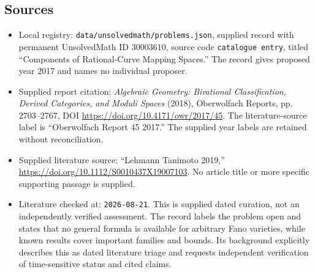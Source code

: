 \documentclass[11pt]{article}
\begin{document}
\subsection{Sources}
\begin{itemize}
\item Local registry: \texttt{data/unsolvedmath/problems.json}, supplied record with permanent UnsolvedMath ID \(30003610\), source code \texttt{catalogue entry}, titled ``Components of Rational-Curve Mapping Spaces.'' The record gives proposed year 2017 and names no individual proposer.
\item Supplied report citation: \emph{Algebraic Geometry: Birational Classification, Derived Categories, and Moduli Spaces} (2018), Oberwolfach Reports, pp. 2703--2767, DOI \url{https://doi.org/10.4171/owr/2017/45}. The literature-source label is ``Oberwolfach Report 45 2017.'' The supplied year labels are retained without reconciliation.
\item Supplied literature source: ``Lehmann Tanimoto 2019,'' \url{https://doi.org/10.1112/S0010437X19007103}. No article title or more specific supporting passage is supplied.
\item Literature checked at: \texttt{2026-08-21}. This is supplied dated curation, not an independently verified assessment. The record labels the problem open and states that no general formula is available for arbitrary Fano varieties, while known results cover important families and bounds. Its background explicitly describes this as dated literature triage and requests independent verification of time-sensitive status and cited claims.
\end{itemize}
\end{document}
